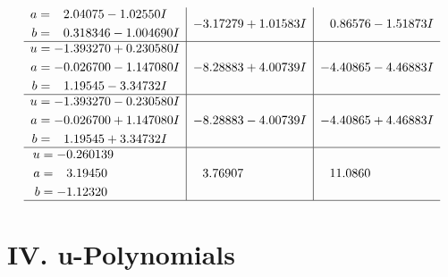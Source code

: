 \documentclass[1p]{elsarticle_modified}
\theoremstyle{definition}
\begin{document}
$$\begin{array}{c|c|c}
\begin{aligned}
a &= \phantom{-}2.04075 - 1.02550 I \\
b &= \phantom{-}0.318346 - 1.004690 I\end{aligned}
 & -3.17279 + 1.01583 I & \phantom{-}0.86576 - 1.51873 I \\ \hline\begin{aligned}
u &= -1.393270 + 0.230580 I \\
a &= -0.026700 - 1.147080 I \\
b &= \phantom{-}1.19545 - 3.34732 I\end{aligned}
 & -8.28883 + 4.00739 I & -4.40865 - 4.46883 I \\ \hline\begin{aligned}
u &= -1.393270 - 0.230580 I \\
a &= -0.026700 + 1.147080 I \\
b &= \phantom{-}1.19545 + 3.34732 I\end{aligned}
 & -8.28883 - 4.00739 I & -4.40865 + 4.46883 I \\ \hline\begin{aligned}
u &= -0.260139\phantom{ +0.000000I} \\
a &= \phantom{-}3.19450\phantom{ +0.000000I} \\
b &= -1.12320\phantom{ +0.000000I}\end{aligned}
 & \phantom{-}3.76907\phantom{ +0.000000I} & \phantom{-}11.0860\phantom{ +0.000000I}\\
 \hline 
 \end{array}$$\newpage
\newpage\renewcommand{\arraystretch}{1}
\centering \section*{ IV. u-Polynomials}
\end{document}
